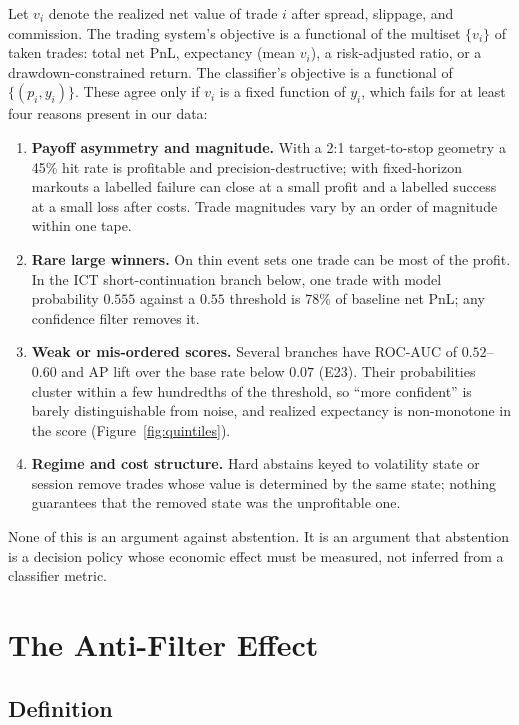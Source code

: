\documentclass[10pt]{article}
\begin{document}
Let $v_i$ denote the realized net value of trade $i$ after spread, slippage, and commission. The trading system's objective is a functional of the multiset $\{v_i\}$ of taken trades: total net PnL, expectancy (mean $v_i$), a risk-adjusted ratio, or a drawdown-constrained return. The classifier's objective is a functional of $\{(p_i,y_i)\}$. These agree only if $v_i$ is a fixed function of $y_i$, which fails for at least four reasons present in our data:
\begin{enumerate}\setlength{\itemsep}{0pt}
\item \textbf{Payoff asymmetry and magnitude.} With a 2:1 target-to-stop geometry a 45\% hit rate is profitable and precision-destructive; with fixed-horizon markouts a labelled failure can close at a small profit and a labelled success at a small loss after costs. Trade magnitudes vary by an order of magnitude within one tape.
\item \textbf{Rare large winners.} On thin event sets one trade can be most of the profit. In the ICT short-continuation branch below, one trade with model probability $0.555$ against a $0.55$ threshold is 78\% of baseline net PnL; any confidence filter removes it.
\item \textbf{Weak or mis-ordered scores.} Several branches have ROC-AUC of $0.52$--$0.60$ and AP lift over the base rate below $0.07$ (E23). Their probabilities cluster within a few hundredths of the threshold, so ``more confident'' is barely distinguishable from noise, and realized expectancy is non-monotone in the score (Figure~\ref{fig:quintiles}).
\item \textbf{Regime and cost structure.} Hard abstains keyed to volatility state or session remove trades whose value is determined by the same state; nothing guarantees that the removed state was the unprofitable one.
\end{enumerate}
None of this is an argument against abstention. It is an argument that abstention is a decision policy whose economic effect must be measured, not inferred from a classifier metric.

\section{The Anti-Filter Effect}

\subsection{Definition}
\end{document}
